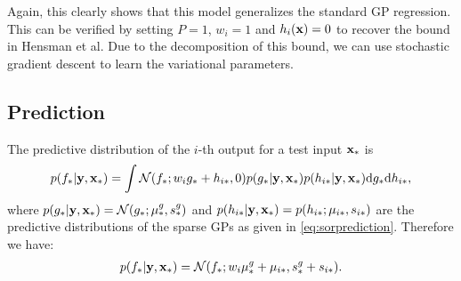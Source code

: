 \documentclass{article} %
\begin{document}
\noindent Again, this clearly shows that this model generalizes the standard GP regression. This can be verified by setting $P = 1$, $w_i = 1$ and $h_i(\mathbf{x}) = 0$ to recover the bound in Hensman et al.
Due to the decomposition of this bound, we can use stochastic gradient descent to learn the variational parameters.

\subsection{Prediction}
The predictive distribution of the $i$-th output for a test input $\mathbf{x}_*$ is 
\begin{align}
p(f_* | \mathbf{y}, \mathbf{x}_*) = \int \mathcal{N}(f_*; w_i g_* + h_{i*}, 0) p(g_* | \mathbf{y}, \mathbf{x}_*) p(h_{i*} | \mathbf{y}, \mathbf{x}_*) \mathrm{d} g_* \mathrm{d} h_{i*},
\end{align}
where $p(g_* | \mathbf{y}, \mathbf{x}_*) = \mathcal{N}(g_*; \mu^g_*, s^g_*)$ and $p(h_{i*} | \mathbf{y}, \mathbf{x}_*) = p(h_{i*}; \mu_{i*}, s_{i*})$ are the predictive distributions of the sparse GPs as given in \ref{eq:sorprediction}.
Therefore we have:
\begin{align}
p(f_* | \mathbf{y}, \mathbf{x}_*) = \mathcal{N}(f_*; w_i \mu^g_* + \mu_{i*}, s^g_* + s_{i*}). 
\end{align}

  
\end{document}
